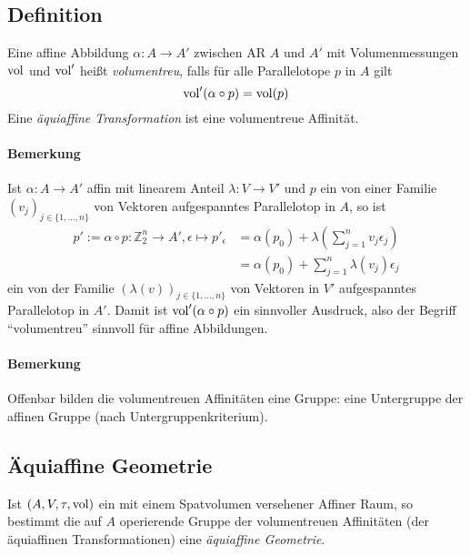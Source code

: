 \subsection{Definition}
	\begin{Definition}
		Eine affine Abbildung $ \alpha:A\to A' $ zwischen AR $ A $ und $ A' $ mit Volumenmessungen $ \operatorname{vol} $ und $ \operatorname{vol}' $ heißt \emph{volumentreu}, falls für alle Parallelotope $ p $ in $ A $ gilt
			\[ \operatorname{vol}'(\alpha\circ p)=\operatorname{vol}(p) \]
		Eine \emph{äquiaffine Transformation} ist eine volumentreue Affinität.
	\end{Definition}
\paragraph{Bemerkung}
	Ist $ \alpha:A\to A' $ affin mit linearem Anteil $ \lambda:V \to V' $ und $ p $ ein von einer Familie $ (v_j)_{j\in\{1,\dots,n\}} $ von Vektoren aufgespanntes Parallelotop in $ A $, so ist
	 \begin{align*}
	 p':= \alpha\circ p:\mathbb{Z}_2^n\to A', \epsilon \mapsto p'_\epsilon &= \alpha(p_0)+\lambda(\sum_{j=1}^{n}v_j\epsilon_j)\\
	 &= \alpha(p_0)+\sum_{j=1}^{n}\lambda(v_j)\epsilon_j
	 \end{align*}
	ein von der Familie $ (\lambda(v))_{j\in \{1,\dots,n\}} $ von Vektoren in $ V' $ aufgespanntes Parallelotop in $ A' $. Damit ist $ \operatorname{vol}'(\alpha\circ p) $ ein sinnvoller Ausdruck, also der Begriff "`volumentreu"' sinnvoll für affine Abbildungen.
\paragraph{Bemerkung}
	Offenbar bilden die volumentreuen Affinitäten eine Gruppe: eine Untergruppe der affinen Gruppe (nach Untergruppenkriterium).
\subsection{Äquiaffine Geometrie}
	\begin{Definition}
	Ist $ (A,V,\tau,\operatorname{vol}) $ ein mit einem Spatvolumen versehener Affiner Raum, so bestimmt die auf $ A $ operierende Gruppe der volumentreuen Affinitäten (der äquiaffinen Transformationen) eine \emph{äquiaffine Geometrie}.
	\end{Definition}
